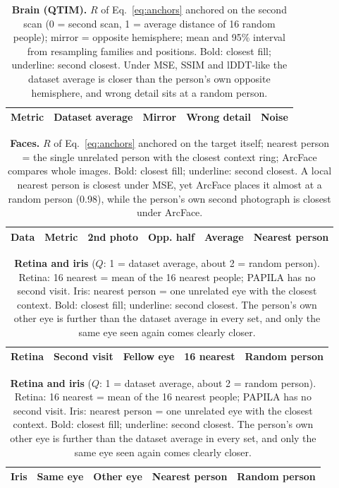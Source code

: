 
\begin{table}[t]
\centering
\caption{\textbf{Brain (QTIM).}
$R$ of Eq.~\ref{eq:anchors} anchored on the second scan (0 = second scan, 1 = average distance of 16 random people); mirror = opposite hemisphere; mean and 95\% interval from resampling families and positions.
Bold: closest fill; underline: second closest.
Under \acs{MSE}, \acs{SSIM} and \acs{lDDT}-like the dataset average is closer than the person's own opposite hemisphere, and wrong detail sits at a random person.}
\label{tab:brain}
\scriptsize
\setlength{\tabcolsep}{2pt}
\begin{tabular}{@{}lcccc@{}}
\toprule
Metric & Dataset average & Mirror & Wrong detail & Noise \\
\midrule

\end{tabular}
\end{table}

\begin{table}[t]
\centering
\caption{\textbf{Faces.}
$R$ of Eq.~\ref{eq:anchors} anchored on the target itself; nearest person = the single unrelated person with the closest context ring; ArcFace compares whole images.
Bold: closest fill; underline: second closest.
A local nearest person is closest under \acs{MSE}, yet ArcFace places it almost at a random person (0.98), while the person's own second photograph is closest under ArcFace.}
\label{tab:face}
\scriptsize
\setlength{\tabcolsep}{2pt}
\begin{tabular}{@{}llcccc@{}}
\toprule
Data & Metric & 2nd photo & Opp. half & Average & Nearest person \\
\midrule

\end{tabular}
\end{table}

\begin{table}[t]
\centering
\caption{\textbf{Retina and iris} ($Q$: 1 = dataset average, about 2 = random person).
Retina: 16 nearest = mean of the 16 nearest people; PAPILA has no second visit.
Iris: nearest person = one unrelated eye with the closest context.
Bold: closest fill; underline: second closest.
The person's own other eye is further than the dataset average in every set, and only the same eye seen again comes clearly closer.}
\label{tab:fundus}
\label{tab:iris}
\scriptsize
\setlength{\tabcolsep}{2pt}
\begin{tabular}{@{}lcccc@{}}
\toprule
Retina & Second visit & Fellow eye & 16 nearest & Random person \\
\midrule

\end{tabular}

\smallskip
\begin{tabular}{@{}lcccc@{}}
\toprule
Iris & Same eye & Other eye & Nearest person & Random person \\
\midrule

\end{tabular}
\end{table}
